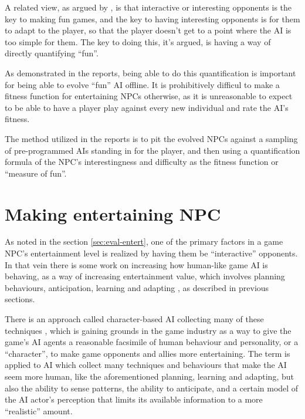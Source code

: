 \documentclass[]{report}
\begin{document}
A related view, as argued by
\citet{yannakakis2004interactive,yannakakis2004evolving}, is that interactive or
interesting opponents is the key to making fun games, and the key to having
interesting opponents is for them to adapt to the player, so that the player
doesn't get to a point where the AI is too simple for them. The key to doing
this, it's argued, is having a way of directly quantifying ``fun''.

As demonstrated in the reports, being able to do this quantification is
important for being able to evolve ``fun'' AI offline. It is prohibitively
difficul to make a fitness function for entertaining NPCs otherwise, as it is
unreasonable to expect to be able to have a player play against every new
individual and rate the AI's fitness.

The method utilized in the reports is to pit the evolved NPCs against a sampling
of pre-programmed AIs standing in for the player, and then using a
quantification formula of the NPC's interestingness and difficulty as the
fitness function or ``measure of fun''.

\section{Making entertaining NPC}
\label{sec:making-entert-npc}

As noted in the section \ref{sec:eval-entert}, one of the primary factors in a game NPC's
entertainment level is realized by having them be ``interactive'' opponents.
In that vein there is some work on increasing how human-like game AI is
behaving, as a way of increasing entertainment value, which involves planning
behaviours, anticipation, learning and adapting
\citep{orkin2004symbolic,orkin2003applying,
  yannakakis2009real,spronck2005adaptive}, as described in previous sections.

There is an approach called character-based AI collecting many of these
techniques \citep[][]{isla2002new}, which is gaining grounds in the game
industry as a way to give the game's AI agents a reasonable facsimile of human
behaviour and personality, or a ``character'', to make game opponents and allies
more entertaining. The term is applied to AI which collect many techniques and
behaviours that make the AI seem more human, like the aforementioned planning,
learning and adapting, but also the ability to sense patterns, the ability to
anticipate, and a certain model of the AI actor's perception that limits its
available information to a more ``realistic'' amount.
\end{document}
